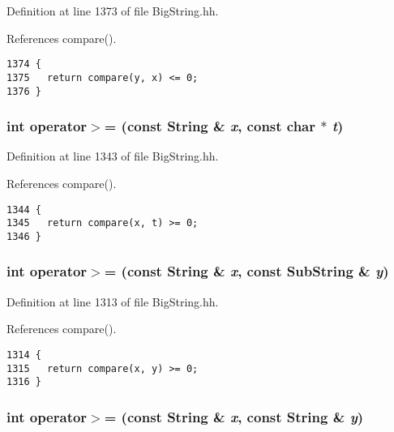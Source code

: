 Definition at line 1373 of file Big\-String.hh.

References compare().



\footnotesize\begin{verbatim}1374 {
1375   return compare(y, x) <= 0;
1376 }
\end{verbatim}\normalsize 
{}
\subsubsection{\setlength{\rightskip}{0pt plus 5cm}int operator$>$= (const {\bf String} \& {\em x}, const char $\ast$ {\em t})\hspace{0.3cm}{\tt  [inline]}}\label{BigString_8hh_a101}




Definition at line 1343 of file Big\-String.hh.

References compare().



\footnotesize\begin{verbatim}1344 {
1345   return compare(x, t) >= 0; 
1346 }
\end{verbatim}\normalsize 
{}
\subsubsection{\setlength{\rightskip}{0pt plus 5cm}int operator$>$= (const {\bf String} \& {\em x}, const {\bf Sub\-String} \& {\em y})\hspace{0.3cm}{\tt  [inline]}}\label{BigString_8hh_a95}




Definition at line 1313 of file Big\-String.hh.

References compare().



\footnotesize\begin{verbatim}1314 {
1315   return compare(x, y) >= 0; 
1316 }
\end{verbatim}\normalsize 
{}
\subsubsection{\setlength{\rightskip}{0pt plus 5cm}int operator$>$= (const {\bf String} \& {\em x}, const {\bf String} \& {\em y})\hspace{0.3cm}{\tt  [inline]}}\label{BigString_8hh_a89}




